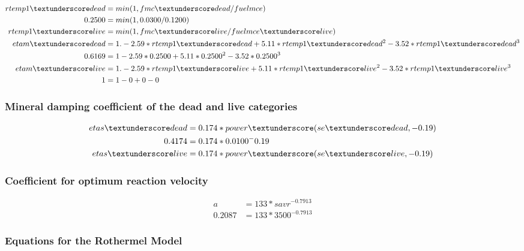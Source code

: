\documentclass{article}
\newcommand\und{\textunderscore}
\begin{document}
\begin{equation}
	\label{damping_moisture_WFA}
	\begin{split}
		rtemp1\und dead   &= min(1,fmc\und dead/fuelmce) \\
		0.2500 &= min(1, 0.0300 / 0.1200) \\
rtemp1\und live   &= min(1,fmc\und live/fuelmce\und live) \\
etam\und dead     &= 1. - 2.59*rtemp1\und dead + 5.11*rtemp1\und dead^2 - 3.52*rtemp1\und dead^3 \\
0.6169 &= 1 - 2.59 * 0.2500 + 5.11 * 0.2500 ^ 2 - 3.52 * 0.2500 ^ 3 \\
etam\und live     &= 1. - 2.59*rtemp1\und live + 5.11*rtemp1\und live^2 - 3.52*rtemp1\und live^3 \\
1 &= 1 - 0 + 0 - 0
	\end{split}
\end{equation}

\subsubsection*{Mineral damping coefficient of the dead and live categories}

\begin{equation}
\label{mineral_damping_WFA}
\begin{split}
	etas\und dead &= 0.174* power\und (se\und dead, -0.19) \\
		0.4174 &= 0.174 * 0.0100^-0.19 \\
	etas\und live &= 0.174* power\und (se\und live, -0.19) 
\end{split}
\end{equation}

\subsubsection*{Coefficient for optimum reaction velocity}
\begin{equation}
	\label{rxn_vel_WFA}
	\begin{split}
		a &= 133 * savr ^ {-0.7913} \\
		0.2087 &= 133 * 3500^{-0.7913}
	\end{split}
\end{equation}

\subsubsection*{Equations for the Rothermel Model}
\end{document}
